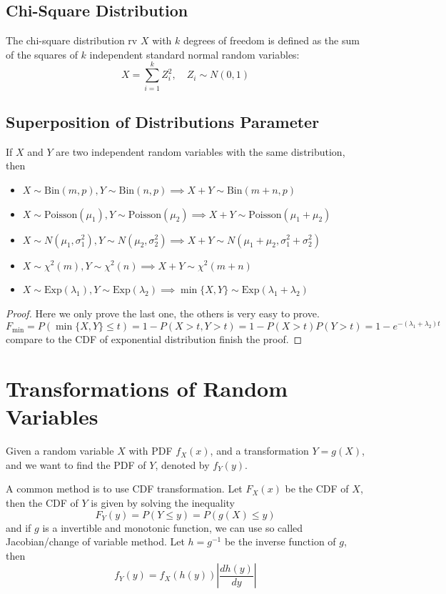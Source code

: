 \documentclass{template}
\newcommand{\Poisson}{\text{Poisson}}
\newcommand{\Binomial}{\text{Bin}}
\newcommand{\ChiSquare}{\chi^2}
\newcommand{\Exponential}{\text{Exp}}
\begin{document}
\subsection{Chi-Square Distribution}
The chi-square distribution rv \( X \) with \( k \) degrees of freedom is defined
as the sum of the squares of \( k \) independent standard normal random variables:
\[
	X = \sum_{i=1}^{k} Z_i^2, \quad Z_i \sim N(0, 1)
\] 

\subsection{Superposition of Distributions Parameter}
If $X$ and $Y$ are two independent random variables with the same distribution, then

\begin{itemize}
	\item $X\sim \Binomial(m, p), Y\sim \Binomial(n, p) \implies X+Y \sim \Binomial(m+n, p)$
	\item $X\sim \Poisson(\mu_1), Y\sim \Poisson(\mu_2) \implies X+Y \sim \Poisson(\mu_1+\mu_2)$
	\item $X\sim N(\mu_1, \sigma_1^2), Y\sim N(\mu_2, \sigma_2^2) \implies X+Y \sim N(\mu_1+\mu_2, \sigma_1^2+\sigma_2^2)$
	\item $X\sim \ChiSquare(m), Y\sim \ChiSquare(n) \implies X+Y \sim \ChiSquare(m+n)$
	\item $X\sim \Exponential(\lambda_1), Y\sim \Exponential(\lambda_2) \implies \min\{X, Y\} \sim \Exponential(\lambda_1+\lambda_2)$
\end{itemize}

\begin{proof}
	Here we only prove the last one, the others is very easy to prove.
	\[
		F_{\min} = P(\min\{X, Y\} \leq t) 
		= 1 - P(X>t, Y>t) = 1 - P(X>t)P(Y>t) = 1 - e^{-(\lambda_1 + \lambda_2)t}
	\] 
	compare to the CDF of exponential distribution finish the proof.
\end{proof}

\section{Transformations of Random Variables}

Given a random variable \( X \) with PDF \( f_X(x) \), and a transformation
\(Y = g(X) \), and we want to find the PDF of \( Y \), denoted by \( f_Y(y) \).

A common method is to use CDF transformation. Let \( F_X(x) \) be the CDF of \( X \), then
the CDF of \( Y \) is given by solving the inequality
\[
	F_Y(y) = P(Y \leq y) = P(g(X) \leq y) 
\] 
and if \( g \) is a invertible and monotonic function, we can use so called
Jacobian/change of variable method. Let \( h = g^{-1} \) be the inverse function of \( g \), then
\[
	f_Y(y) = f_X(h(y)) \left| \frac{dh(y)}{dy} \right|
\] 
\end{document}
